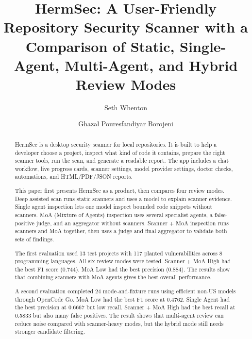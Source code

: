 \documentclass[sigconf,nonacm]{acmart}
\begin{document}
\title{HermSec: A User-Friendly Repository Security Scanner with a Comparison of Static, Single-Agent, Multi-Agent, and Hybrid Review Modes}

\author{Seth Whenton}
\email{}

\author{Ghazal Pouresfandiyar Borojeni}
\email{}

\begin{abstract}
HermSec is a desktop security scanner for local repositories. It is built to help a developer choose a project, inspect what kind of code it contains, prepare the right scanner tools, run the scan, and generate a readable report. The app includes a chat workflow, live progress cards, scanner settings, model provider settings, doctor checks, automations, and HTML/PDF/JSON reports.

This paper first presents HermSec as a product, then compares four review modes. Deep assisted scan runs static scanners and uses a model to explain scanner evidence. Single agent inspection lets one model inspect bounded code snippets without scanners. MoA (Mixture of Agents) inspection uses several specialist agents, a false-positive judge, and an aggregator without scanners. Scanner + MoA inspection runs scanners and MoA together, then uses a judge and final aggregator to validate both sets of findings.

The first evaluation used 13 test projects with 117 planted vulnerabilities across 8 programming languages. All six review modes were tested. Scanner + MoA High had the best F1 score (0.744). MoA Low had the best precision (0.884). The results show that combining scanners with MoA agents gives the best overall performance.

A second evaluation completed 24 mode-and-fixture runs using efficient non-US models through OpenCode Go. MoA Low had the best F1 score at 0.4762. Single Agent had the best precision at 0.6667 but low recall. Scanner + MoA High had the best recall at 0.5833 but also many false positives. The result shows that multi-agent review can reduce noise compared with scanner-heavy modes, but the hybrid mode still needs stronger candidate filtering.
\end{abstract}

\end{document}
